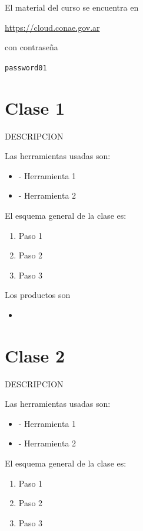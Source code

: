 \documentclass[12pt]{report}
\begin{document}
El material del curso se encuentra en

\begin{center}
    \href{https://cloud.conae.gov.ar}{https://cloud.conae.gov.ar}
\end{center}

con contraseña

\begin{center}
    \texttt{password01}
\end{center}

\section{Clase 1}
DESCRIPCION

Las herramientas usadas son:

\begin{itemize}
    \item {} - Herramienta 1
    \item {} - Herramienta 2
\end{itemize}

El esquema general de la clase es:

\begin{enumerate}
    \item Paso 1
    \item Paso 2
    \item Paso 3
\end{enumerate}

Los productos son 

\begin{itemize}
    \item {}
\end{itemize}

\section{Clase 2}

DESCRIPCION

Las herramientas usadas son:

\begin{itemize}
    \item {} - Herramienta 1
    \item {} - Herramienta 2
\end{itemize}

El esquema general de la clase es:

\begin{enumerate}
    \item Paso 1
    \item Paso 2
    \item Paso 3
\end{enumerate}
\end{document}
